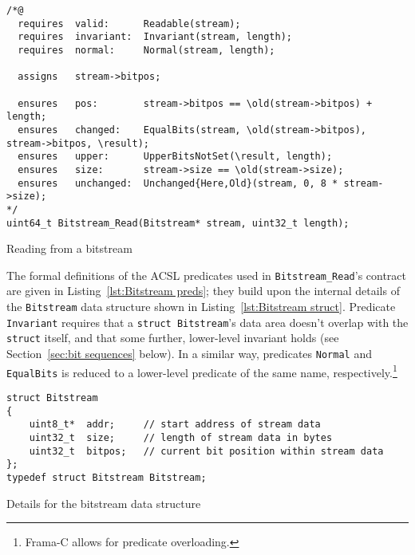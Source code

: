 \begin{listing}[hbt]
\begin{minipage}{0.99\textwidth}
\begin{lstlisting}[style=acsl-block]
/*@
  requires  valid:      Readable(stream);
  requires  invariant:  Invariant(stream, length);
  requires  normal:     Normal(stream, length);

  assigns   stream->bitpos;

  ensures   pos:        stream->bitpos == \old(stream->bitpos) + length;
  ensures   changed:    EqualBits(stream, \old(stream->bitpos), stream->bitpos, \result);
  ensures   upper:      UpperBitsNotSet(\result, length);
  ensures   size:       stream->size == \old(stream->size);
  ensures   unchanged:  Unchanged{Here,Old}(stream, 0, 8 * stream->size);
*/
uint64_t Bitstream_Read(Bitstream* stream, uint32_t length);
\end{lstlisting}
\end{minipage}
\caption{\label{lst:Bitstream_Read spec}Reading from a bitstream}
\end{listing}




The formal definitions of the ACSL predicates used
in \lstinline{Bitstream_Read}'s contract are given in
Listing~\ref{lst:Bitstream preds}; they build upon the internal
details of the \lstinline{Bitstream} data structure shown in
Listing~\ref{lst:Bitstream struct}.
%
Predicate \lstinline{Invariant} requires that a 
\lstinline{struct Bitstream}'s data area
doesn't overlap with the \lstinline{struct} itself, and that some
further, lower-level invariant holds (see Section~\ref{sec:bit sequences}
below).
%
In a similar way, predicates \lstinline{Normal} and
\lstinline{EqualBits} is reduced to a
lower-level predicate of the same 
name, respectively.\footnote{Frama-C allows for predicate overloading.}




\begin{listing}[hbt]
\begin{minipage}{0.99\textwidth}
\begin{lstlisting}[style=acsl-block]
struct Bitstream
{
    uint8_t*  addr;     // start address of stream data
    uint32_t  size;     // length of stream data in bytes
    uint32_t  bitpos;   // current bit position within stream data
};
typedef struct Bitstream Bitstream;
\end{lstlisting}
\end{minipage}
\caption{\label{lst:Bitstream struct}
	Details for the bitstream data structure}
\end{listing}






